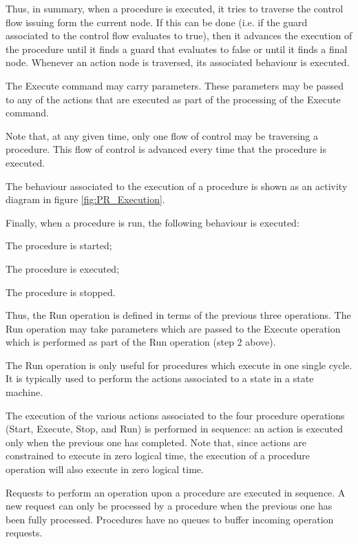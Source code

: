 Thus, in summary, when a procedure is executed, it tries to traverse the control flow issuing
form the current node. If this can be done (i.e. if the guard associated to the control flow
evaluates to true), then it advances the execution of the procedure until it finds a guard that
evaluates to false or until it finds a final node. Whenever an action node is traversed, its
associated behaviour is executed.

The Execute command may carry parameters. These parameters may be passed to any of the
actions that are executed as part of the processing of the Execute command.

Note that, at any given time, only one flow of control may be traversing a procedure. This flow
of control is advanced every time that the procedure is executed.

The behaviour associated to the execution of a procedure is shown as an activity diagram in
figure \ref{fig:PR_Execution}.

Finally, when a procedure is run, the following behaviour is executed:

\begin{fw_enumerate}
\item The procedure is started;
\item The procedure is executed;
\item The procedure is stopped. 
\end{fw_enumerate}

Thus, the Run operation is defined in terms of the previous three operations. The Run
operation may take parameters which are passed to the Execute operation which is performed
as part of the Run operation (step 2 above).

The Run operation is only useful for procedures which execute in one single cycle. It is
typically used to perform the actions associated to a state in a state machine.

The execution of the various actions associated to the four procedure operations (Start,
Execute, Stop, and Run) is performed in sequence: an action is executed only when the
previous one has completed. Note that, since actions are constrained to execute in zero logical
time, the execution of a procedure operation will also execute in zero logical time.

Requests to perform an operation upon a procedure are executed in sequence. A new request
can only be processed by a procedure when the previous one has been fully processed.
Procedures have no queues to buffer incoming operation requests.

